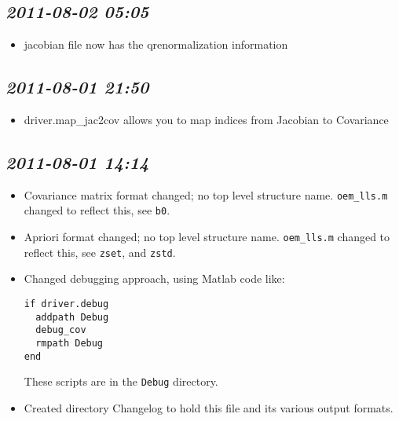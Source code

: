 \documentclass[11pt]{article}
\begin{document}
\subsection{\textit{2011-08-02 05:05}}
\label{sec-2_6}


\begin{itemize}
\item jacobian file now has the qrenormalization information
\end{itemize}
\subsection{\textit{2011-08-01 21:50}}
\label{sec-2_7}


\begin{itemize}
\item driver.map\_jac2cov allows you to map indices from Jacobian to Covariance
\end{itemize}
\subsection{\textit{2011-08-01 14:14}}
\label{sec-2_8}


\begin{itemize}
\item Covariance matrix format changed; no top level structure name.
  \texttt{oem\_lls.m} changed to reflect this, see \texttt{b0}.
\item Apriori format changed; no top level structure name.
  \texttt{oem\_lls.m} changed to reflect this, see \texttt{zset}, and \texttt{zstd}.
\item Changed debugging approach, using Matlab code like:
\begin{verbatim}
if driver.debug
  addpath Debug
  debug_cov
  rmpath Debug
end
\end{verbatim}
  These scripts are in the \texttt{Debug} directory.
\item Created directory Changelog to hold this file and its various output
  formats.
\end{itemize}
\end{document}
